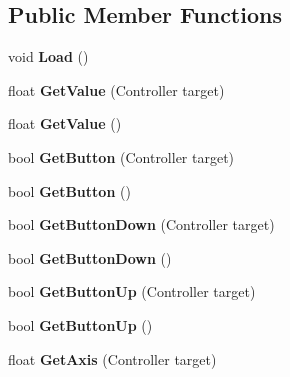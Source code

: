 \subsection*{Public Member Functions}
\begin{DoxyCompactItemize}
\item 
\hypertarget{class_input_set_af313334a197519e847f9127b7005b86b}{void {\bfseries Load} ()}\label{class_input_set_af313334a197519e847f9127b7005b86b}

\item 
\hypertarget{class_input_set_a0899bc9a8c322fd5309a5436bb6a0021}{float {\bfseries Get\-Value} (Controller target)}\label{class_input_set_a0899bc9a8c322fd5309a5436bb6a0021}

\item 
\hypertarget{class_input_set_a8fe91422990a811bed458a87a8694060}{float {\bfseries Get\-Value} ()}\label{class_input_set_a8fe91422990a811bed458a87a8694060}

\item 
\hypertarget{class_input_set_a9bd00da865cf79b19a02e72acd5e34fd}{bool {\bfseries Get\-Button} (Controller target)}\label{class_input_set_a9bd00da865cf79b19a02e72acd5e34fd}

\item 
\hypertarget{class_input_set_ad72a4dde5e7acbede05dff7f00f3ec99}{bool {\bfseries Get\-Button} ()}\label{class_input_set_ad72a4dde5e7acbede05dff7f00f3ec99}

\item 
\hypertarget{class_input_set_a2b2d7a4abbe0e4a38c2c1ee2914e8a02}{bool {\bfseries Get\-Button\-Down} (Controller target)}\label{class_input_set_a2b2d7a4abbe0e4a38c2c1ee2914e8a02}

\item 
\hypertarget{class_input_set_a74aa966862d35b34cdae27e8ff630370}{bool {\bfseries Get\-Button\-Down} ()}\label{class_input_set_a74aa966862d35b34cdae27e8ff630370}

\item 
\hypertarget{class_input_set_a7d15a11df3541744ef92481920c23410}{bool {\bfseries Get\-Button\-Up} (Controller target)}\label{class_input_set_a7d15a11df3541744ef92481920c23410}

\item 
\hypertarget{class_input_set_a83a692b6c15332aef107062a849d46bc}{bool {\bfseries Get\-Button\-Up} ()}\label{class_input_set_a83a692b6c15332aef107062a849d46bc}

\item 
\hypertarget{class_input_set_ad6138a68ba961cda193fda0d3694a8f0}{float {\bfseries Get\-Axis} (Controller target)}\label{class_input_set_ad6138a68ba961cda193fda0d3694a8f0}


\end{DoxyCompactItemize}
